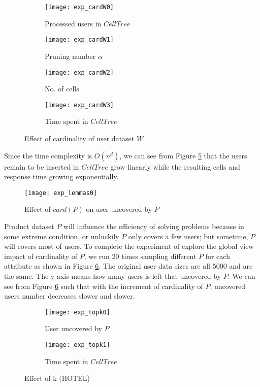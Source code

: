 \begin{figure}[ht!]
  \centering
  \begin{subfigure}[b]{0.45\linewidth}
    \texttt{[image: exp\_cardW0]}
    \caption{Processed users in $CellTree$}
    \label{exp_cardW0}
  \end{subfigure}
  \begin{subfigure}[b]{0.45\linewidth}
    \texttt{[image: exp\_cardW1]}
    \caption{Pruning number $\alpha$}
    \label{exp_cardW1}
  \end{subfigure}
  \begin{subfigure}[b]{0.45\linewidth}
    \texttt{[image: exp\_cardW2]}
    \caption{No. of cells}
    \label{exp_cardW2}
  \end{subfigure}
  \begin{subfigure}[b]{0.45\linewidth}
    \texttt{[image: exp\_cardW3]}
    \caption{Time spent in $CellTree$}
    \label{exp_cardW3}
  \end{subfigure}
  \caption{Effect of cardinality of user dataset $W$}
  \label{cardW}
\end{figure}

Since the time complexity is $O(n^d)$, we can see from Figure \ref{cardW} that the users 
remain to be inserted in $CellTree$ grow linearly while the resulting cells and response 
time growing exponentially. 


\begin{figure}[hbt!]
  \centering
  \texttt{[image: exp\_lemmas0]}
  \caption{Effect of $card(P)$ on user uncovered by $P$}
  \label{p_on_user}
\end{figure}
Product dataset $P$ will influence the efficiency of solving problems because in some
extreme condition, or unluckily $P$ only covers a few users; but sometime, $P$ will covers 
most of users. To complete the experiment of explore the global view impact of 
cardinality of $P$, we run 20 times sampling different $P$ for each attribute as shown in 
Figure \ref{p_on_user}. The original user data sizes are all 5000 and are the same. The y
axis means how many users is left that uncovered by $P$. We can see from Figure 
\ref{p_on_user} such that with the increment of cardinality of $P$, uncovered 
users number decreases slower and slower. 



\begin{figure}[ht!]
  \centering
  \begin{subfigure}[b]{0.45\linewidth}
    \texttt{[image: exp\_topk0]}
    \caption{User uncovered by $P$}
    \label{k_change_user_cnt}
  \end{subfigure}
  \begin{subfigure}[b]{0.45\linewidth}
    \texttt{[image: exp\_topk1]}
    \caption{Time spent in $CellTree$}
    \label{k_change_time}
  \end{subfigure}
  \caption{Effect of k (HOTEL)}
  \label{k_effect}
\end{figure}

